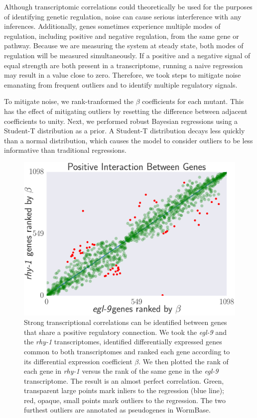 \documentclass[9pt,twocolumn,twoside]{pnas-new}
\newcommand{\egl}{\emph{egl-9}}
\newcommand{\rhy}{\emph{rhy-1}}
\begin{document}
Although transcriptomic correlations could theoretically be used for the
purposes of identifying genetic regulation, noise can cause serious interference
with any inferences. Additionally, genes sometimes experience multiple modes of
regulation, including positive and negative regulation, from the same gene or
pathway. Because we are measuring the system at steady state, both modes of
regulation will be measured simultaneously. If a positive and a negative signal
of equal strength are both present in a transcriptome, running a naive regression
may result in a value close to zero.
Therefore, we took steps to mitigate noise emanating from frequent outliers and
to identify multiple regulatory signals.

To mitigate noise, we rank-tranformed the $\beta$ coefficients for each mutant.
This has the effect of mitigating outliers by resetting the difference between
adjacent coefficients to unity. Next, we performed robust Bayesian regressions
using a Student-T distribution as a prior. A Student-T distribution decays less
quickly than a normal distribution, which causes the model to consider outliers
to be less informative than traditional regressions.

\begin{figure}%
\centering
\includegraphics[width=\linewidth]{figs/correlative_genetics.pdf}
\caption{
Strong transcriptional correlations can be identified between genes
that share a positive regulatory connection. We took the \egl{} and the \rhy{}
transcriptomes, identified differentially expressed genes common to both
transcriptomes and ranked each gene according to its differential expression
coefficient $\beta$. We then plotted the rank of each gene in \rhy{} versus the
rank of the same gene in the \egl{} transcriptome. The result is an almost
perfect correlation. Green, transparent large points mark inliers to the
regression (blue line); red, opaque, small points mark outliers to the
regression. The two furthest outliers are annotated as pseudogenes in WormBase.
}
\label{fig:genetic_interactions}
\end{figure}
\end{document}
